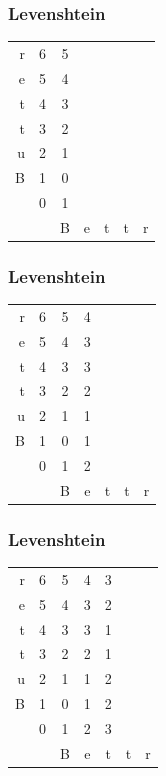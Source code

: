 \documentclass[10pt]{beamer}
\begin{document}
\begin{frame}[fragile]
  \frametitle{Levenshtein}

  \centering
\begin{tabular}{ r || c c c c c c  }
  r & 6 & 5 &  &  &  &  \\
  e & 5 & 4 &  &  &  &  \\
  t & 4 & 3 &  &  &  &  \\
  t & 3 & 2 &  &  &  &  \\
  u & 2 & 1 &  &  &  &  \\
  B & 1 & 0 &  &  &  &  \\
    & 0 & 1 &  &  &  &  \\
  \hline
    &   & B & e & t & t & r \\
\end{tabular}

  
\end{frame}

\begin{frame}[fragile]
  \frametitle{Levenshtein}

  \centering
\begin{tabular}{ r || c c c c c c  }
  r & 6 & 5 & 4 &  &  &  \\
  e & 5 & 4 & 3 &  &  &  \\
  t & 4 & 3 & 3 &  &  &  \\
  t & 3 & 2 & 2 &  &  &  \\
  u & 2 & 1 & 1 &  &  &  \\
  B & 1 & 0 & 1 &  &  &  \\
    & 0 & 1 & 2 &  &  &  \\
  \hline
    &   & B & e & t & t & r \\
\end{tabular}

  
\end{frame}


\begin{frame}[fragile]
  \frametitle{Levenshtein}

  \centering
\begin{tabular}{ r || c c c c c c  }
  r & 6 & 5 & 4 & 3 &  &  \\
  e & 5 & 4 & 3 & 2 &  &  \\
  t & 4 & 3 & 3 & 1 &  &  \\
  t & 3 & 2 & 2 & 1 &  &  \\
  u & 2 & 1 & 1 & 2 &  &  \\
  B & 1 & 0 & 1 & 2 &  &  \\
    & 0 & 1 & 2 & 3 &  &  \\
  \hline
    &   & B & e & t & t & r \\
\end{tabular}

  
\end{frame}
\end{document}

